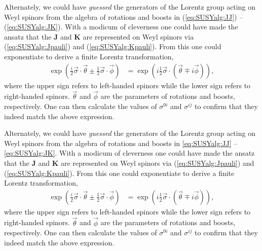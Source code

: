 \documentclass[12pt, oneside]{report}    %
\begin{document}
Alternately, we could have \textit{guessed} the generators of the Lorentz group acting on Weyl spinors from the algebra of rotations and boosts in (\ref{eq:SUSYalg:JJ}) -- (\ref{eq:SUSYalg:JK}). With a modicum of cleverness one could have made the ansatz that the $\mathbf J$ and $\mathbf K$ are represented on Weyl spinors via (\ref{eq:SUSYalg:Jpauli}) and (\ref{eq:SUSYalg:Kpauli}). From this one could exponentiate to derive a finite Lorentz transformation,
\begin{align}
    \exp\left({\frac i2 \vec\sigma\cdot\vec\theta \pm \frac 12 \vec\sigma\cdot\vec\phi}\right) &= \exp\left({i\frac 12 \vec\sigma\cdot(\vec\theta \mp i\vec\phi)}\right),
\end{align}
where the upper sign refers to left-handed spinors while the lower sign refers to right-handed spinors. $\vec \theta$ and $\vec \phi$ are the parameters of rotations and boosts, respectively. One can then calculate the values of $\sigma^{0i}$ and $\sigma^{ij}$ to confirm that they indeed match the above expression.

Alternately, we could have \textit{guessed} the generators of the Lorentz group acting on Weyl spinors from the algebra of rotations and boosts in \eqref{eq:SUSYalg:JJ} -- \eqref{eq:SUSYalg:JK}. With a modicum of cleverness one could have made the ansatz that the $\mathbf J$ and $\mathbf K$ are represented on Weyl spinors via (\ref{eq:SUSYalg:Jpauli}) and (\ref{eq:SUSYalg:Kpauli}). From this one could exponentiate to derive a finite Lorentz transformation,
\begin{align}
    \exp\left({\frac i2 \vec\sigma\cdot\vec\theta \pm \frac 12 \vec\sigma\cdot\vec\phi}\right) &= \exp\left({i\frac 12 \vec\sigma\cdot(\vec\theta \mp i\vec\phi)}\right),
\end{align}
where the upper sign refers to left-handed spinors while the lower sign refers to right-handed spinors. $\vec \theta$ and $\vec \phi$ are the parameters of rotations and boosts, respectively. One can then calculate the values of $\sigma^{0i}$ and $\sigma^{ij}$ to confirm that they indeed match the above expression.
\end{document}
